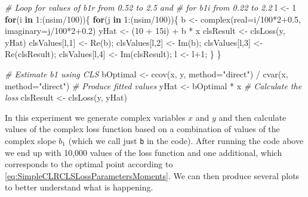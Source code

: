 \documentclass[
]{book}
\newenvironment{Shaded}{\begin{snugshade}}{\end{snugshade}}
\newcommand{\AttributeTok}[1]{\textcolor[rgb]{0.77,0.63,0.00}{#1}}
\newcommand{\CommentTok}[1]{\textcolor[rgb]{0.56,0.35,0.01}{\textit{#1}}}
\newcommand{\ControlFlowTok}[1]{\textcolor[rgb]{0.13,0.29,0.53}{\textbf{#1}}}
\newcommand{\DecValTok}[1]{\textcolor[rgb]{0.00,0.00,0.81}{#1}}
\newcommand{\FloatTok}[1]{\textcolor[rgb]{0.00,0.00,0.81}{#1}}
\newcommand{\FunctionTok}[1]{\textcolor[rgb]{0.00,0.00,0.00}{#1}}
\newcommand{\NormalTok}[1]{#1}
\newcommand{\OtherTok}[1]{\textcolor[rgb]{0.56,0.35,0.01}{#1}}
\newcommand{\SpecialCharTok}[1]{\textcolor[rgb]{0.00,0.00,0.00}{#1}}
\newcommand{\StringTok}[1]{\textcolor[rgb]{0.31,0.60,0.02}{#1}}
\begin{document}
\begin{Shaded}
\begin{Highlighting}[]
\CommentTok{\# Loop for values of b1r from 0.52 to 2.5 and}
\CommentTok{\# for b1i from 0.22 to 2.2}
\NormalTok{l }\OtherTok{\textless{}{-}} \DecValTok{1}
\ControlFlowTok{for}\NormalTok{(i }\ControlFlowTok{in} \DecValTok{1}\SpecialCharTok{:}\NormalTok{(nsim}\SpecialCharTok{/}\DecValTok{100}\NormalTok{))\{}
    \ControlFlowTok{for}\NormalTok{(j }\ControlFlowTok{in} \DecValTok{1}\SpecialCharTok{:}\NormalTok{(nsim}\SpecialCharTok{/}\DecValTok{100}\NormalTok{))\{}
\NormalTok{        b }\OtherTok{\textless{}{-}} \FunctionTok{complex}\NormalTok{(}\AttributeTok{real=}\NormalTok{i}\SpecialCharTok{/}\DecValTok{100}\SpecialCharTok{*}\DecValTok{2}\FloatTok{+0.5}\NormalTok{, }\AttributeTok{imaginary=}\NormalTok{j}\SpecialCharTok{/}\DecValTok{100}\SpecialCharTok{*}\DecValTok{2}\FloatTok{+0.2}\NormalTok{)}
\NormalTok{        yHat }\OtherTok{\textless{}{-}}\NormalTok{ (}\DecValTok{10} \SpecialCharTok{+}\NormalTok{ 15i) }\SpecialCharTok{+}\NormalTok{ b }\SpecialCharTok{*}\NormalTok{ x}
\NormalTok{        clsResult }\OtherTok{\textless{}{-}} \FunctionTok{clsLoss}\NormalTok{(y, yHat)}
\NormalTok{        clsValues[l,}\DecValTok{1}\NormalTok{] }\OtherTok{\textless{}{-}} \FunctionTok{Re}\NormalTok{(b);}
\NormalTok{        clsValues[l,}\DecValTok{2}\NormalTok{] }\OtherTok{\textless{}{-}} \FunctionTok{Im}\NormalTok{(b);}
\NormalTok{        clsValues[l,}\DecValTok{3}\NormalTok{] }\OtherTok{\textless{}{-}} \FunctionTok{Re}\NormalTok{(clsResult);}
\NormalTok{        clsValues[l,}\DecValTok{4}\NormalTok{] }\OtherTok{\textless{}{-}} \FunctionTok{Im}\NormalTok{(clsResult);}
\NormalTok{        l }\OtherTok{\textless{}{-}}\NormalTok{ l}\SpecialCharTok{+}\DecValTok{1}\NormalTok{;}
\NormalTok{    \}}
\NormalTok{\}}

\CommentTok{\# Estimate b1 using CLS}
\NormalTok{bOptimal }\OtherTok{\textless{}{-}} \FunctionTok{ccov}\NormalTok{(x, y, }\AttributeTok{method=}\StringTok{"direct"}\NormalTok{) }\SpecialCharTok{/}
            \FunctionTok{cvar}\NormalTok{(x, }\AttributeTok{method=}\StringTok{"direct"}\NormalTok{)}
\CommentTok{\# Produce fitted values}
\NormalTok{yHat }\OtherTok{\textless{}{-}}\NormalTok{ bOptimal }\SpecialCharTok{*}\NormalTok{ x}
\CommentTok{\# Calculate the loss}
\NormalTok{clsResult }\OtherTok{\textless{}{-}} \FunctionTok{clsLoss}\NormalTok{(y, yHat)}
\end{Highlighting}
\end{Shaded}

In this experiment we generate complex variables \(x\) and \(y\) and then calculate values of the complex loss function based on a combination of values of the complex slope \(b_1\) (which we call just \texttt{b} in the code). After running the code above we end up with 10,000 values of the loss function and one additional, which corresponds to the optimal point according to \eqref{eq:SimpleCLRCLSLossParametersMoments}. We can then produce several plots to better understand what is happening.
\end{document}
